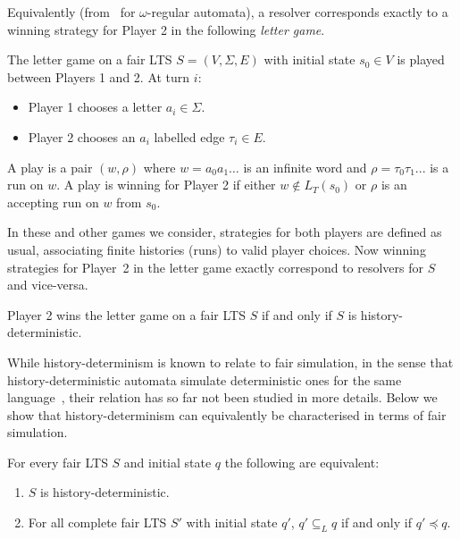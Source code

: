 \documentclass[10pt,a4paper]{amsart}
\theoremstyle{definition}
\numberwithin{equation}{section}
\newcommand{\lang}{L_T}  %
\newcommand{\langincl}[1][L]{\subseteq_{L}}
\newcommand{\fairsim}[1][]{\preceq}
\newcommand{\lts}{S}
\newcommand{\ltsStates}{V}
\newcommand{\ltsAlphabet}{\Sigma}
\newcommand{\ltsTransitions}{E}
\newcommand{\ltsDef}{\lts = (\ltsStates, \ltsAlphabet, \ltsTransitions)}
\begin{document}
Equivalently (from~\cite{BL19} for $\omega$-regular automata), a resolver corresponds exactly to a winning strategy for Player 2 in the following \textit{letter game}.
\begin{definition}
The letter game on a fair LTS $\ltsDef$ with initial state $s_0\in V$ is played between Players 1 and 2. At turn $i$:
\begin{itemize}
\item Player 1 chooses a letter $a_i\in \Sigma$.
\item Player 2 chooses an $a_i$ labelled edge $\tau_i \in E$.
\end{itemize}
A play is a pair $(w,\rho)$ where $w=a_0a_1\ldots$ is an infinite word and $\rho=\tau_0\tau_1...$ is a run on $w$. A play is winning for Player 2 if either $w\notin \lang(s_0)$ or $\rho$ is an accepting run on $w$ from $s_0$.
\end{definition}
In these and other games we consider, strategies for both players are defined as usual, associating finite histories (runs) to valid player choices.
Now winning strategies for Player~2 in the letter game
exactly correspond to resolvers for $\lts$ and vice-versa.
\begin{proposition}
Player 2 wins the letter game on a fair LTS $S$ if and only if $S$ is history-deterministic.
\end{proposition}




While history-determinism is known to relate to fair simulation, in the sense that history-deterministic automata simulate deterministic ones for the same language~\cite{HP06}, their relation has so far not been studied in more details. Below we show that history-determinism can equivalently be characterised in terms of fair simulation.



\begin{theorem}\label{thm:triangle}
For every fair LTS $\lts$ %
and initial state $q$
the following are equivalent:
\begin{enumerate}
\item \label{triangle-hd} $\lts$ is history-deterministic.
\item \label{triangle-sim}For all complete fair LTS $\lts'$ with initial state $q'$, %
    $q' \langincl q$ if and only if $q' \fairsim q$. 
\end{enumerate}
\end{theorem}
\end{document}
